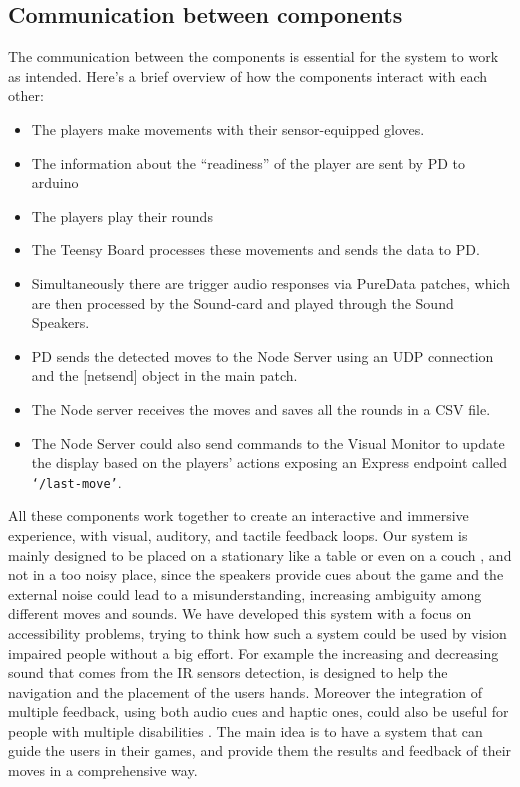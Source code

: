 \documentclass[11pt,a4paper]{report}
\begin{document}
\subsection*{Communication between components}
The communication between the components is essential for the system to work as intended. Here's a brief overview of how the components interact with each other:
\begin{itemize}
  \item The players make movements with their sensor-equipped gloves.
  \item The information about the “readiness” of the player are sent by PD to arduino
  \item The players play their rounds
  \item The Teensy Board processes these movements and sends the data to PD.
  \item Simultaneously there are trigger audio responses via PureData patches, which are then processed by the Sound-card and played through the Sound Speakers.
  \item PD sends the detected moves to the Node Server using an UDP connection and the [netsend] object in the main patch.
  \item The Node server receives the moves and saves all the rounds in a CSV file.
  \item The Node Server could also send commands to the Visual Monitor to update the display based on the players' actions exposing an Express endpoint called \texttt{‘/last-move’}.
\end{itemize}

\noindent All these components work together to create an interactive and immersive experience, with visual, auditory, and tactile feedback loops.
Our system is mainly designed to be placed on a stationary like a table or even on a couch , and not in a too noisy place, since the speakers provide cues about the game and the external noise could lead to a misunderstanding, increasing ambiguity among different moves and sounds.
We have developed this system with a focus on accessibility problems, trying to think how such a system could be used by vision impaired people without a big effort.
For example the increasing and decreasing sound that comes from the IR sensors detection, is designed to help the navigation and the placement of the users hands.
Moreover the integration of multiple feedback, using both audio cues and haptic ones, could also be useful for people with multiple disabilities \cite*{2}.
The main idea is to have a system that can guide the users in their games, and provide them the results and feedback of their moves in a comprehensive way.
\end{document}
